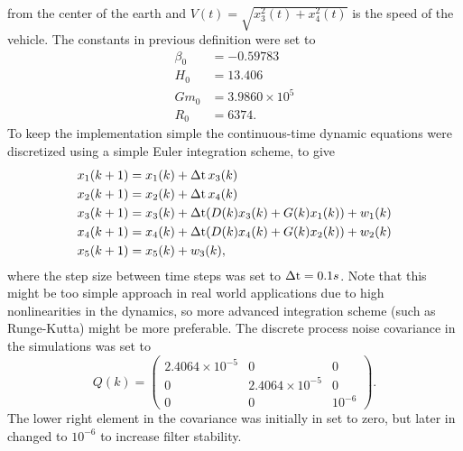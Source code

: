 from the center of the earth and $V(t) = \sqrt{x_3^2(t) + x_4^2(t)}$
is the speed of the vehicle.  The constants in previous definition
were set to
%
\begin{equation}
\begin{split}
%
\beta_0 & = -0.59783 \\ H_0 & = 13.406 \\ Gm_0 & = 3.9860 \times 10^5
\\ R_0 & = 6374.
%
\end{split}
\end{equation}
%
To keep the implementation simple the continuous-time dynamic
equations were discretized using a simple Euler integration scheme, to
give
%
\begin{equation}
\begin{split}
%
x_1(k+1) & = x_1(k) + \dt x_3(k) \\ x_2(k+1) & = x_2(k) + \dt x_4(k)
\\ x_3(k+1) & = x_3(k) + \dt (D(k)x_3(k) + G(k)x_1(k)) + w_1(k) \\
x_4(k+1) & = x_4(k) + \dt (D(k)x_4(k) + G(k)x_2(k)) + w_2(k) \\
x_5(k+1) & = x_5(k) + w_3(k),
%
\end{split}
\end{equation}
%
where the step size between time steps was set to $\operatorname{\Delta t} = 0.1s$. Note
that this might be too simple approach in real world applications due
to high nonlinearities in the dynamics, so more advanced integration
scheme (such as Runge-Kutta) might be more preferable. The discrete
process noise covariance in the simulations was set to
%
\begin{equation}
%
Q(k) = \begin{pmatrix} 2.4064 \times 10^{-5} & 0 & 0 \\ 0 & 2.4064
\times 10^{-5} & 0 \\ 0 & 0 & 10^{-6}
\end{pmatrix}.
%
\end{equation}
%
The lower right element in the covariance was initially in \citet{Julier+Uhlmann:2004} set to zero, but later in \citet{Julier+Uhlmann:2004b}
changed to $10^{-6}$ to increase filter stability.


